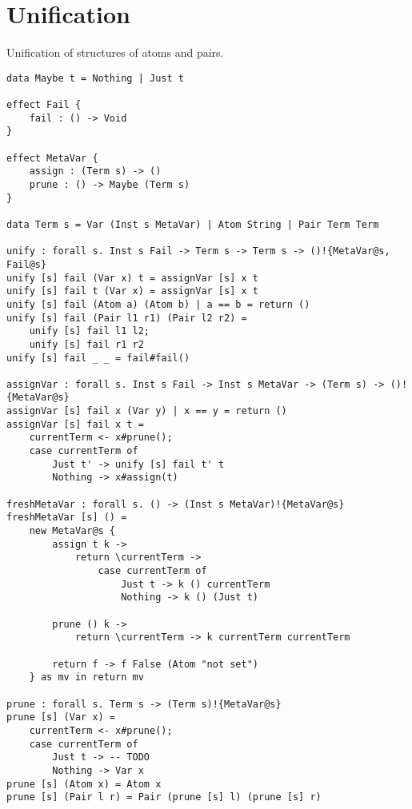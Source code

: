 \section{Unification}
Unification of structures of atoms and pairs.
\begin{verbatim}
data Maybe t = Nothing | Just t

effect Fail {
	fail : () -> Void
}

effect MetaVar {
	assign : (Term s) -> ()
	prune : () -> Maybe (Term s)
}

data Term s = Var (Inst s MetaVar) | Atom String | Pair Term Term

unify : forall s. Inst s Fail -> Term s -> Term s -> ()!{MetaVar@s, Fail@s}
unify [s] fail (Var x) t = assignVar [s] x t
unify [s] fail t (Var x) = assignVar [s] x t
unify [s] fail (Atom a) (Atom b) | a == b = return ()
unify [s] fail (Pair l1 r1) (Pair l2 r2) =
	unify [s] fail l1 l2;
	unify [s] fail r1 r2
unify [s] fail _ _ = fail#fail()

assignVar : forall s. Inst s Fail -> Inst s MetaVar -> (Term s) -> ()!{MetaVar@s}
assignVar [s] fail x (Var y) | x == y = return ()
assignVar [s] fail x t =
	currentTerm <- x#prune();
	case currentTerm of
		Just t' -> unify [s] fail t' t
		Nothing -> x#assign(t)

freshMetaVar : forall s. () -> (Inst s MetaVar)!{MetaVar@s}
freshMetaVar [s] () =
	new MetaVar@s {
		assign t k ->
			return \currentTerm ->
				case currentTerm of
					Just t -> k () currentTerm
					Nothing -> k () (Just t)
		
		prune () k ->
			return \currentTerm -> k currentTerm currentTerm
		
		return f -> f False (Atom "not set")
	} as mv in return mv

prune : forall s. Term s -> (Term s)!{MetaVar@s}
prune [s] (Var x) =
	currentTerm <- x#prune();
	case currentTerm of
		Just t -> -- TODO
		Nothing -> Var x
prune [s] (Atom x) = Atom x
prune [s] (Pair l r) = Pair (prune [s] l) (prune [s] r)
\end{verbatim}

